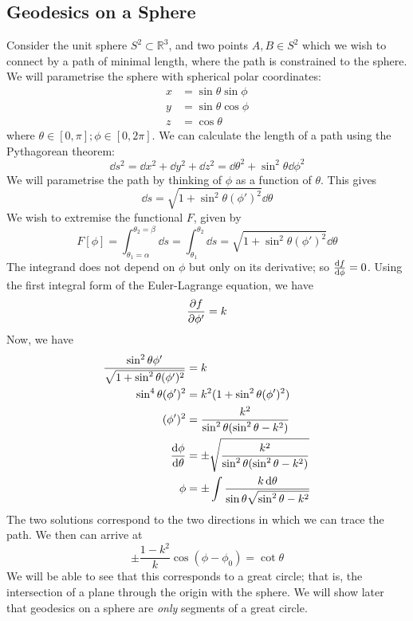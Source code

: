 \subsection{Geodesics on a Sphere}
Consider the unit sphere \( S^2 \subset \mathbb R^3 \), and two points \( A, B \in S^2 \) which we wish to connect by a path of minimal length, where the path is constrained to the sphere. We will parametrise the sphere with spherical polar coordinates:
\begin{align*}
    x &= \sin\theta \sin\phi\\
    y &= \sin\theta\cos\phi \\
    z &= \cos\theta
\end{align*}
where \( \theta \in [0, \pi]; \phi \in [0, 2\pi] \). We can calculate the length of a path using the Pythagorean theorem:
\[ \dd{s}^2 = \dd{x}^2 + \dd{y}^2 + \dd{z}^2 = \dd{\theta}^2 + \sin^2 \theta \dd{\phi}^2 \]
We will parametrise the path by thinking of \( \phi \) as a function of \( \theta \). This gives
\[ \dd{s} = \sqrt{1 + \sin^2 \theta (\phi')^2} \dd{\theta} \]
We wish to extremise the functional \( F \), given by
\[ F[\phi] = \int_{\theta_1 = \alpha}^{\theta_2 = \beta} \dd{s} = \int_{\theta_1}^{\theta_2} \dd{s} = \sqrt{1 + \sin^2 \theta (\phi')^2} \dd{\theta} \]
The integrand does not depend on \( \phi \) but only on its derivative; so \( \dv{f}{\phi} = 0 \). Using the first integral form of the Euler-Lagrange equation, we have
\[ \pdv{f}{\phi'} = k \]
Now, we have
\begin{align*}
    \frac{\sin^2 \theta \phi'}{\sqrt{1 + \sin^2 \theta (\phi')^2}} &= k \\
    \sin^4 \theta (\phi')^2 &= k^2 (1 + \sin^2 \theta (\phi')^2) \\
    (\phi')^2 &= \frac{k^2}{\sin^2 \theta (\sin^2 \theta - k^2)} \\
    \dv{\phi}{\theta} &= \pm\sqrt{\frac{k^2}{\sin^2 \theta (\sin^2 \theta - k^2)}} \\
    \phi &= \pm\int \frac{k \dd{\theta}}{\sin \theta \sqrt{\sin^2 \theta - k^2}} \\
\end{align*}
The two solutions correspond to the two directions in which we can trace the path. We then can arrive at
\[ \pm \frac{1 - k^2}{k} \cos(\phi - \phi_0) = \cot \theta \]
We will be able to see that this corresponds to a great circle; that is, the intersection of a plane through the origin with the sphere. We will show later that geodesics on a sphere are \textit{only} segments of a great circle.


